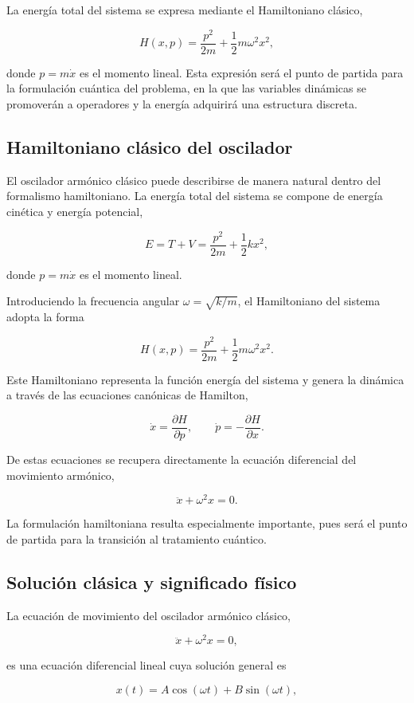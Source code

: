\documentclass[11pt,a4paper,spanish]{book}
\begin{document}
La energía total del sistema se expresa mediante el Hamiltoniano clásico,

\[
H(x,p) = \frac{p^2}{2m} + \frac{1}{2} m\omega^2 x^2,
\]

donde $p = m\dot{x}$ es el momento lineal. Esta expresión será el punto de partida para la formulación cuántica del problema, en la que las variables dinámicas se promoverán a operadores y la energía adquirirá una estructura discreta.
\subsection{Hamiltoniano clásico del oscilador}

El oscilador armónico clásico puede describirse de manera natural dentro del formalismo hamiltoniano. 
La energía total del sistema se compone de energía cinética y energía potencial,

\[
E = T + V = \frac{p^2}{2m} + \frac{1}{2}k x^2,
\]

donde $p = m\dot{x}$ es el momento lineal.

Introduciendo la frecuencia angular $\omega = \sqrt{k/m}$, el Hamiltoniano del sistema adopta la forma

\[
H(x,p) = \frac{p^2}{2m} + \frac{1}{2}m\omega^2 x^2.
\]

Este Hamiltoniano representa la función energía del sistema y genera la dinámica a través de las ecuaciones canónicas de Hamilton,

\[
\dot{x} = \frac{\partial H}{\partial p}, 
\qquad
\dot{p} = -\frac{\partial H}{\partial x}.
\]

De estas ecuaciones se recupera directamente la ecuación diferencial del movimiento armónico,

\[
\ddot{x} + \omega^2 x = 0.
\]

La formulación hamiltoniana resulta especialmente importante, pues será el punto de partida para la transición al tratamiento cuántico.

\subsection{Solución clásica y significado físico}

La ecuación de movimiento del oscilador armónico clásico,

\[
\ddot{x} + \omega^2 x = 0,
\]

es una ecuación diferencial lineal cuya solución general es

\[
x(t) = A \cos(\omega t) + B \sin(\omega t),
\]
\end{document}
